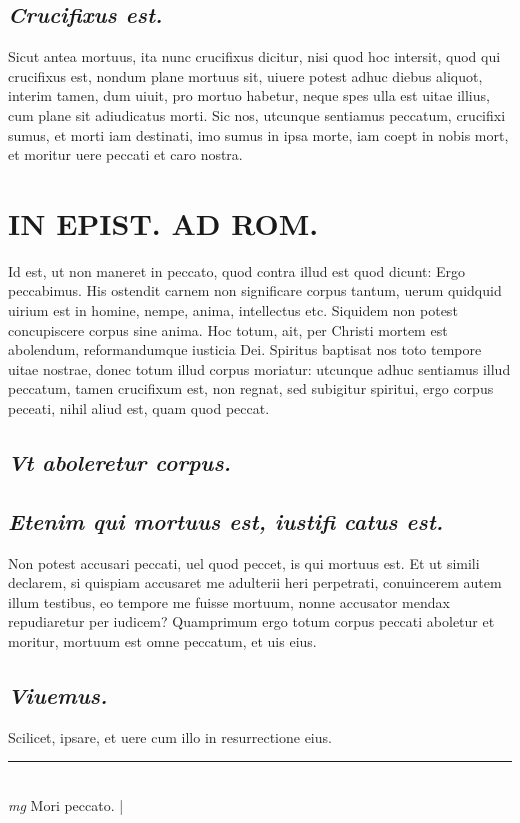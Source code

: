 \documentclass{article}
\begin{document}
\begin{pages}
\subsection*{\textit{Crucifixus est. }}\pstart Sicut antea mortuus, ita nunc crucifixus dicitur, nisi quod hoc intersit, quod qui crucifixus est, nondum plane mortuus sit, uiuere potest adhuc diebus aliquot, interim tamen, dum uiuit, pro mortuo habetur, neque  spes ulla est uitae illius, cum plane sit adiudicatus morti. Sic nos, utcunque sentiamus peccatum, crucifixi sumus, et morti iam destinati, imo sumus in ipsa morte, iam coept in nobis mort, et moritur uere peccati et caro nostra.   \pend
\section*{IN EPIST. AD ROM.  }
\marginpar{[ p.61 ]}\pstart Id est, ut non maneret in peccato, quod contra illud est quod dicunt: Ergo peccabimus. His ostendit carnem non significare corpus tantum, uerum quidquid uirium est in homine, nempe, anima, intellectus etc. Siquidem non potest concupiscere corpus sine anima. Hoc totum, ait, per Christi mortem est abolendum, reformandumque iusticia Dei. Spiritus baptisat nos toto tempore uitae nostrae, donec totum illud corpus moriatur: utcunque adhuc sentiamus illud peccatum, tamen crucifixum est, non regnat, sed subigitur spiritui, ergo corpus peceati, nihil aliud est, quam quod peccat.  \pend
{}
{}
\subsection*{\textit{Vt aboleretur corpus. }}
{}
\subsection*{\textit{Etenim qui mortuus est, iustifi catus est. }}\pstart Non potest accusari peccati, uel quod peccet, is qui mortuus est. Et ut simili declarem, si quispiam accusaret me adulterii heri perpetrati, conuincerem autem illum testibus, eo tempore me fuisse mortuum, nonne accusator mendax repudiaretur per iudicem? Quamprimum ergo totum corpus peccati aboletur et moritur, mortuum est omne peccatum, et uis eius.   \pend
{}
{}
\subsection*{\textit{Viuemus. }}\pstart Scilicet, ipsare, et uere cum illo in resurrectione eius.   \pend
\vspace{0.5cm}\noindent
\vspace{0.2cm}\rule{1cm}{0.2pt}\\ 
\hspace{0.2cm}\textit{mg}
\footnotesize Mori peccato.  
\normalsize| 

\end{pages}
\end{document}
